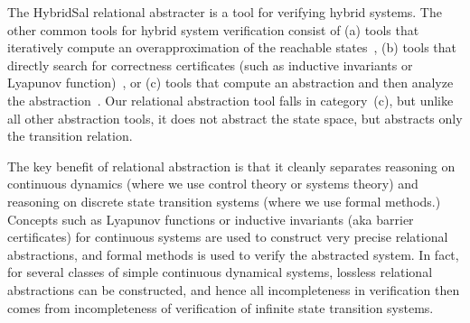 \documentclass{llncs}
\begin{document}
The HybridSal relational abstracter is a tool for verifying
hybrid systems.  The other common tools for hybrid
system verification consist of 
(a) tools that iteratively compute
an overapproximation of the reachable states~\cite{SpaceExsmall},
(b) tools that directly search for correctness certificates
(such as inductive invariants or Lyapunov function)~\cite{sostools,ST11:ISSACsmall},
or
(c) tools that compute an abstraction and then analyze
the abstraction~\cite{HybridSALsmall,AlurDangIvancic03:TACASsmall,Clarke03:TACASsmall}.
Our relational abstraction tool falls in category~(c), but unlike all
other abstraction tools, it does
not abstract the state space, but abstracts only the transition relation.
 
The key benefit of relational abstraction
is that it cleanly separates reasoning on continuous
dynamics (where we use control theory or systems theory)
and
reasoning on discrete state transition systems (where we use 
formal methods.)
Concepts such as Lyapunov functions or inductive invariants
(aka barrier certificates) for continuous systems are used
to construct very precise relational abstractions, and
formal methods is used to verify the abstracted system.
In fact, for several classes of simple continuous dynamical systems, 
lossless relational abstractions can be constructed, and hence
all incompleteness in verification then comes from incompleteness
of verification of infinite state transition systems. %

\end{document}
